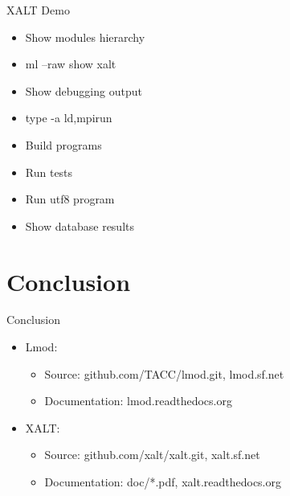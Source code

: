 \documentclass{beamer}
\begin{document}
\begin{frame}{XALT Demo}
  \begin{itemize}
    \item Show modules hierarchy
    \item ml --raw show xalt
    \item Show debugging output
    \item type -a {ld,mpirun}
    \item Build programs
    \item Run tests
    \item Run utf8 program
    \item Show database results
  \end{itemize}
\end{frame}

\section{Conclusion}
\begin{frame}{Conclusion}
  \begin{itemize}
    \item Lmod:
      \begin{itemize}
        \item Source: github.com/TACC/lmod.git, lmod.sf.net
        \item Documentation: lmod.readthedocs.org
      \end{itemize}
    \item XALT:
      \begin{itemize}
        \item Source: github.com/xalt/xalt.git, xalt.sf.net
        \item Documentation: doc/*.pdf, xalt.readthedocs.org
      \end{itemize}
  \end{itemize}
\end{frame}
\end{document}
